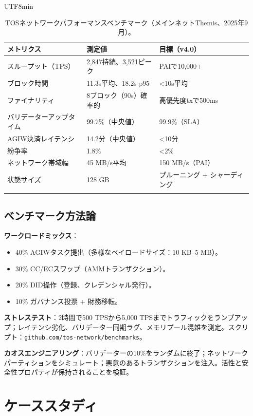 \documentclass[11pt]{article}
\begin{document}
\begin{CJK}{UTF8}{min}
\begin{itemize}[noitemsep]
\begin{longtable}{@{}p{}p{}p{}@{}}
\toprule
\textbf{メトリクス} & \textbf{測定値} & \textbf{目標（v4.0）} \\\midrule
スループット（TPS） & 2,847持続、3,521ピーク & PAIで10,000+ \\
ブロック時間 & 11.3s平均、18.2s p95 & <10s平均 \\
ファイナリティ & 8ブロック（90s）確率的 & 高優先度txで500ms \\
バリデーターアップタイム & 99.7\%（中央値） & 99.9\%（SLA） \\
AGIW決済レイテンシ & 14.2分（中央値） & <10分 \\
紛争率 & 1.8\% & <2\% \\
ネットワーク帯域幅 & 45 MB/s平均 & 150 MB/s（PAI） \\
状態サイズ & 128 GB & プルーニング + シャーディング \\
\bottomrule
\caption{TOSネットワークパフォーマンスベンチマーク（メインネットThemis、2025年9月）。}
\end{longtable}

\subsection{ベンチマーク方法論}

\textbf{ワークロードミックス}：
\begin{itemize}[noitemsep]
  \item 40\% AGIWタスク提出（多様なペイロードサイズ：10 KB--5 MB）。
  \item 30\% CC/ECスワップ（AMMトランザクション）。
  \item 20\% DID操作（登録、クレデンシャル発行）。
  \item 10\% ガバナンス投票 + 財務移転。
\end{itemize}

\textbf{ストレステスト}：2時間で500 TPSから5,000 TPSまでトラフィックをランプアップ；レイテンシ劣化、バリデーター同期ラグ、メモリプール混雑を測定。スクリプト：\texttt{github.com/tos-network/benchmarks}。

\textbf{カオスエンジニアリング}：バリデーターの10\%をランダムに終了；ネットワークパーティションをシミュレート；悪意のあるトランザクションを注入。活性と安全性プロパティが保持されることを検証。

\section{ケーススタディ}
\label{sec:case-studies}


\end{itemize}
\end{CJK}
\end{document}
